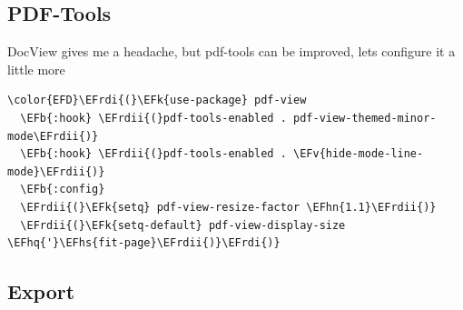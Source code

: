 \documentclass{scrartcl}
\newcommand{\EFk}[1]{\textcolor{EFk}{#1}} %
\newcommand{\EFb}[1]{\textcolor{EFb}{#1}} %
\newcommand{\EFv}[1]{\textcolor{EFv}{#1}} %
\newcommand{\EFhn}[1]{\textcolor{EFhn}{\textbf{#1}}} %
\newcommand{\EFhq}[1]{\textcolor{EFhq}{#1}} %
\newcommand{\EFhs}[1]{\textcolor{EFhs}{#1}} %
\newcommand{\EFrdi}[1]{\textcolor{EFrdi}{#1}} %
\newcommand{\EFrdii}[1]{\textcolor{EFrdii}{#1}} %
\begin{document}
\subsection{PDF-Tools}
\label{sec:orgddd7c3f}
DocView gives me a headache, but pdf-tools can be improved, lets configure it a little more
\begin{Code}
\begin{Verbatim}[]
\color{EFD}\EFrdi{(}\EFk{use-package} pdf-view
  \EFb{:hook} \EFrdii{(}pdf-tools-enabled . pdf-view-themed-minor-mode\EFrdii{)}
  \EFb{:hook} \EFrdii{(}pdf-tools-enabled . \EFv{hide-mode-line-mode}\EFrdii{)}
  \EFb{:config}
  \EFrdii{(}\EFk{setq} pdf-view-resize-factor \EFhn{1.1}\EFrdii{)}
  \EFrdii{(}\EFk{setq-default} pdf-view-display-size \EFhq{'}\EFhs{fit-page}\EFrdii{)}\EFrdi{)}
\end{Verbatim}
\end{Code}

\subsection{Export}
\label{sec:org5142ff2}
\end{document}
